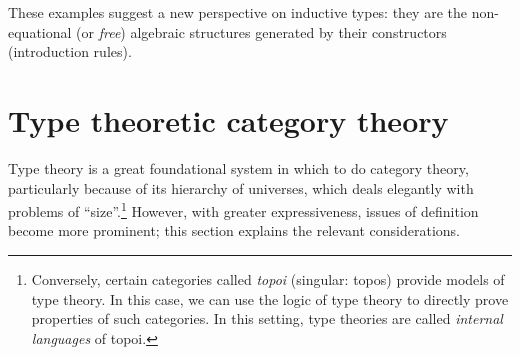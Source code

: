 \documentclass[a5paper]{article}
\begin{document}


These examples suggest a new perspective on inductive types: they are the
non-equational (or \textit{free}) algebraic structures generated by their
constructors (introduction rules). 

\section{Type theoretic category theory}
\label{sec:type-theoretic-category-theory}

Type theory is a great foundational system in which to do category theory,
particularly because of its hierarchy of universes, which deals elegantly with
problems of ``size''.\footnote{
  Conversely, certain categories called \textit{topoi} (singular: topos) provide
  models of type theory. In this case, we can use the logic of type theory to
  directly prove properties of such categories. In this setting, type theories
  are called \textit{internal languages} of topoi.} However, with greater
expressiveness,
issues of definition become more prominent; this section explains the relevant
considerations.
\end{document}
